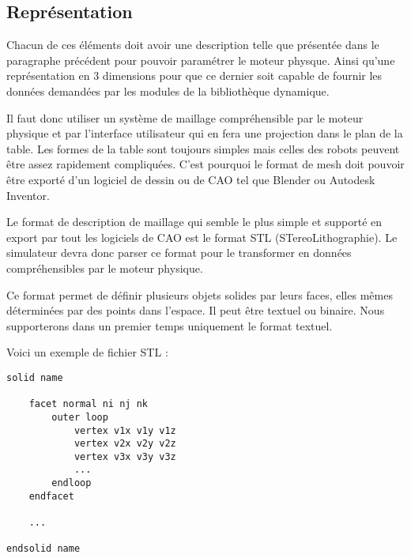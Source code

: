 \subsection{Représentation}


Chacun de ces éléments doit avoir une description telle que présentée dans le paragraphe précédent pour pouvoir paramétrer le moteur physque.
Ainsi qu'une représentation en 3 dimensions pour que ce dernier soit capable de fournir les données demandées par les modules de la bibliothèque dynamique. 

Il faut donc utiliser un système de maillage compréhensible par le moteur physique et par l'interface utilisateur qui en fera une projection dans le plan de la table. Les formes de la table sont toujours simples mais celles des robots peuvent être assez rapidement compliquées. C'est pourquoi le format de mesh doit pouvoir être exporté d'un logiciel de dessin ou de CAO tel que Blender ou Autodesk Inventor.

Le format de description de maillage qui semble le plus simple et supporté en export par tout les logiciels de CAO est le format STL (STereoLithographie). Le simulateur devra donc parser ce format pour le transformer en données compréhensibles par le moteur physique. 

Ce format permet de définir plusieurs objets solides par leurs faces, elles mêmes déterminées par des points dans l'espace. Il peut être textuel ou binaire. Nous supporterons dans un premier temps uniquement le format textuel.

Voici un exemple de fichier STL :

\begin{verbatim}
solid name

    facet normal ni nj nk
        outer loop
            vertex v1x v1y v1z
            vertex v2x v2y v2z
            vertex v3x v3y v3z
            ...
        endloop
    endfacet
    
    ...

endsolid name
\end{verbatim}